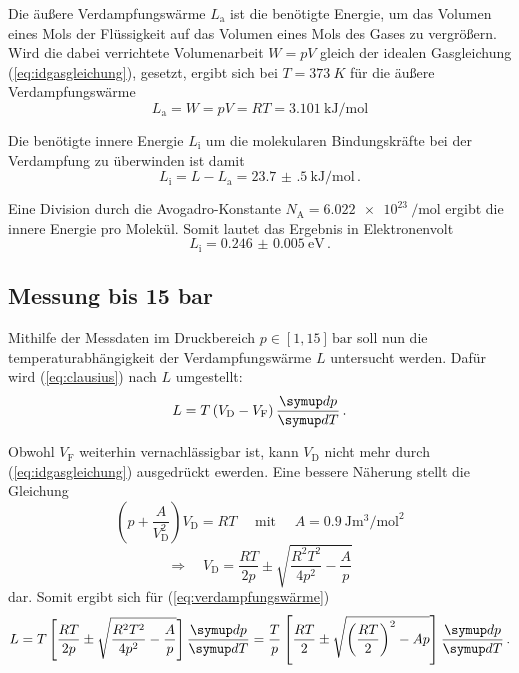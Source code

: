 Die äußere Verdampfungswärme $L_\text{a}$ ist die benötigte Energie, 
um das Volumen eines Mols der Flüssigkeit auf das Volumen eines Mols des Gases zu vergrößern.
Wird die dabei verrichtete Volumenarbeit $W = pV$  gleich der idealen Gasgleichung (\ref{eq:idgasgleichung}),
gesetzt, ergibt sich bei $T = \qty{373}{K}$ für die äußere Verdampfungswärme
\begin{equation}
    L_{\text{a}} = W = pV = RT = \qty{3.101}{\kilo\joule\per\mol}
\end{equation}

Die benötigte innere Energie $L_\text{i}$ um die molekularen Bindungskräfte bei der Verdampfung zu überwinden ist damit
\begin{equation}
    L_{\mathrm{i}} = L-L_{\mathrm{a}} = \qty{23.7(5)}{\kilo\joule\per\mol} \, .
\end{equation}

Eine Division durch die Avogadro-Konstante $N_\text{A} = \qty{6.022e23}{\per\mol}$
ergibt die innere Energie pro Molekül. Somit lautet das Ergebnis in Elektronenvolt
\begin{equation}
    L_{\text{i}} = \qty{0.246(5)}{\eV} \, .
\end{equation}


\subsection{Messung bis 15 bar}

Mithilfe der Messdaten im Druckbereich $p \in [1, 15] \, \mathrm{bar}$ soll nun die temperaturabhängigkeit
der Verdampfungswärme $L$ untersucht werden. Dafür wird (\ref{eq:clausius}) nach $L$ umgestellt:
\begin{equation}
    L = T \left(V_{\text{D}} - V_{\text{F}}\right) \frac {\dif{p}} {\dif{T}} \, . \label{eq:verdampfungswärme}
\end{equation}

Obwohl $V_\text{F}$ weiterhin vernachlässigbar ist, kann $V_\text{D}$ nicht mehr durch (\ref{eq:idgasgleichung})
ausgedrückt ewerden.
Eine bessere Näherung stellt die Gleichung
\begin{equation}
    \left(p + \frac {A} {V_{\text{D}}^{2}}\right) V_{\text{D}} = RT 
    \quad \text { mit } \quad
    A = \qty[per-mode=fraction]{0.9}{\joule\m\cubed\per\mol\squared} 
\end{equation}
\begin{equation}
    \Rightarrow \quad V_{\text{D}} = \frac{RT}{2p} \pm \sqrt{ \frac {R^{2} T^{2}} {4 p^{2}} - \frac{A}{p} } 
\end{equation}
dar. Somit ergibt sich für (\ref{eq:verdampfungswärme}) 
\begin{equation}
    L = T\left[\frac{R T}{2 p} \pm \sqrt{\frac{R^{2} T^{2}}{4 p^{2}}-\frac{A}{p}}\right] \frac{\dif{p}}{\dif{T}} 
    = \frac{T}{p} \left[\frac{R T}{2} \pm \sqrt{\left(\frac{R T}{2}\right)^{2}-A p}\right] \frac{\dif{p}}{\dif{T}} \, .
    \label{eq:L}
\end{equation}

